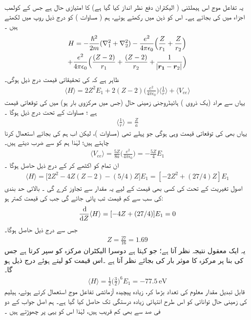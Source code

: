  
یہ تفاعل موج اس   ہیملٹنی  ( الیکٹران   دفع  نظر انداز کیا گیا ہے)   کا امتیازی حال ہے  جس کے  کولمب اجزاء  میں  کی بجائے  ہے۔ اس کو ذہن میں رکھتے ہوئے،   ہم    ( مساوات ) کو درج ذیل روپ میں   لکھتے ہیں ۔
\begin{multline}
H=-\frac{\hslash^{2}}{2m}(\nabla_{1}^{2}+\nabla_{2}^{2})-\frac{e^{2}}{4\pi\epsilon_{0}}\Big(\frac{Z}{r_{1}}+\frac{Z}{r_{2}}\Big)\\
+\frac{e^{2}}{4\pi\epsilon_{0}}\Big(\frac{(Z-2)}{r_{1}}+\frac{(Z-2)}{r_{2}}+\frac{1}{\abs{{{\boldsymbol{r_{1}}}}-{{\boldsymbol{r}}}_{2}}}\Big)
\end{multline}
 ظاہر ہے کہ کی تحقیقاتی قیمت درج ذیل ہوگی۔
\begin{align}
\langle H \rangle = 2Z^{2}E_{1}+2(Z-2)\big(\frac{e^{2}}{4\pi\epsilon_{0}}\big)\big\langle \frac{1}{r}\big\rangle + \langle V_{ee} \rangle 
\end{align}
 یہاں  سے مراد (یک ذروی  ) ہائیڈروجنی  زمینی حال    (جس میں مرکزوی بار   ہو)  میں  کی  توقعاتی   قیمت ہے ؛ مساوات  کے تحت درج ذیل ہوگا ۔
\begin{align}
\big\langle \frac{1}{r} \big\rangle = \frac{Z}{a} 
\end{align}
 یہاں بھی   کی توقعاتی قیمت وہی ہوگی جو پہلے تھی (مساوات   )،   لیکن اب ہم   کی بجائے     استعمال کرنا چاہتے ہیں؛  لہٰذا ہم   کو    سے ضرب دیتے ہیں۔ 
 \begin{align}
\langle V_{ee} \rangle =\frac{5Z}{8a}\big(\frac{e^{2}}{4\pi\epsilon_{0}}\big)=-\frac{5Z}{4}E_{1} 
\end{align}
  ان تمام کو اکٹھے کر کے  درج ذیل حاصل ہوگا ۔
 \begin{align}
\langle H \rangle =\big[2Z^{2}-4Z(Z-2)-(5/4)Z\big]E_{1}=[-2Z^{2}+(27/4)Z]E_{1} 
\end{align}
 اصول تغیریت کے تحت  کی کسی بھی  قیمت کے لیے یہ مقدار   سے تجاوز کرے گی ۔ بالائی حد بندی کی سب سے کم قیمت تب پائی جائے  گی جب    کی قیمت  کمتر  ہو:
\begin{align*}
\frac{\dif}{\dif Z}\langle H \rangle =[-4Z+(27/4)]E_{1}=0
\end{align*}
 جس سے درج ذیل حاصل ہوگا۔
\begin{align}
Z=\frac{27}{16}=1.69
\end{align}
 یہ ایک معقول نتیجہ نظر آتا ہے؛  جو کہتا ہے دوسرا الیکٹران مرکزہ کو سپر کرتا ہے جس کی بنا پر مرکزہ کا موثر بار   کی بجائے   نظر آتا ہے ۔اس قیمت کو   لیتے ہوئے درج ذیل ہو گا۔
\begin{align}
\langle H \rangle =\frac{1}{2}\big(\frac{3}{2}\big)^{6}E_{1}=\SI{-77.5}{\electronvolt}
\end{align}
 قابل تبدیل مقدار  معلوم کی تعداد بڑھا کر،  زیادہ پیچیدہ آزمائشی تفاعل موج  استعمال کرتے ہوئے،  ہیلیم کی زمینی حال توانائی کو اس طرح  انتہائی زیادہ درستگی تک حاصل کیا گیا ہے۔ ہم اصل  جواب کے دو فی صد سے بھی کم   قریب   ہیں،  لہٰذا اس کو یہی پر چھوڑتے ہیں ۔
 
